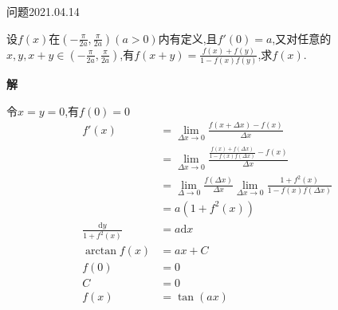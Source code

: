 \begin{mybox}{问题2021.04.14}
	
	\qquad 设$f(x)$在$(-\frac{\pi}{2a},\frac{\pi}{2a})(a>0)$内有定义,且$f'(0)=a$,又对任意的$x,y,x+y\in(-\frac{\pi}{2a},\frac{\pi}{2a})$,有$f(x+y)=\frac{f(x)+f(y)}{1-f(x)f(y)}$,求$f(x)$.
\end{mybox}
\noindent
\textbf{解}

令$x=y=0$,有$f(0)=0$
\begin{align*}
	f'(x)&=\lim \limits_{\Delta x \to 0} \frac{f(x+\Delta x)-f(x)}{\Delta x}\\
	&=\lim \limits_{\Delta x \to 0} \frac{\frac{f(x)+f(\Delta x)}{1-f(x)f(\Delta x)}-f(x)}{\Delta x}\\
	&=\lim\limits_{\Delta \to 0}\frac{f(\Delta x)}{\Delta x} \lim \limits_{\Delta x \to 0} \frac{1+f^2(x)}{1-f(x)f(\Delta x)}\\
	&=a(1+f^2(x))\\
 \frac{\mathrm{d}y}{1+f^2(x)}&=a\mathrm{d}x\\
 \arctan f(x) &=ax+C\\
         f(0)&=0\\
         C&=0\\
         f(x)&=\tan(ax)
\end{align*}